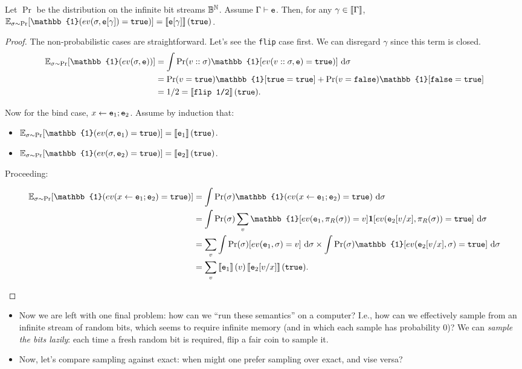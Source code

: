 \documentclass{tufte-handout}
\begin{document}
\begin{theorem}
  Let $\Pr$ be the distribution on the infinite bit streams $\mathbb{B}^{\mathbb{N}}$. Assume $\Gamma \vdash \texttt{e}$.
  Then, for any $\gamma \in \left \llbracket {\Gamma} \right \rrbracket$,
  $\E_{\sigma \sim \Pr}[\mathbb{1}(ev(\sigma, \te[\gamma]) = \true)] = \dbracket{\te[\gamma]}(\true)$.
\end{theorem}
\begin{proof}
  The non-probabilistic cases are straightforward. Let's see the \texttt{flip} 
  case first. We can disregard $\gamma$ since this term is closed.
  \begin{align*}
    \E_{\sigma \sim \Pr}[\mathbb{1}(ev(\sigma, \te))] &= 
    \int \Pr(v::\sigma) \mathbb{1}[ev(v::\sigma, \te) = \true)]~\mathrm{d}\sigma \\ 
    &= \Pr(v = \true) \mathbb{1}[\true = \true] + \Pr(v = \false)\mathbb{1}[\false = \true] \\ 
    &= 1/2 = \dbracket{\texttt{flip~1/2}}(\true).
  \end{align*}

  Now for the bind case, $x \leftarrow \texttt{e}_1; \texttt{e}_2$. Assume by induction that:
  \begin{itemize}
    \item $\E_{\sigma \sim \Pr}[\mathbb{1}(ev(\sigma, \te_1) = \true)] = \dbracket{\te_1}(\true)$.
    \item $\E_{\sigma \sim \Pr}[\mathbb{1}(ev(\sigma, \te_2) = \true)] = \dbracket{\te_2}(\true)$.
  \end{itemize}
  Proceeding:
  \begin{fullwidth}
  \begin{align}
    \E_{\sigma \sim \Pr}[\mathbb{1}(ev(x \leftarrow \te_1; \te_2) = \true)] 
    &= \int \Pr(\sigma) \mathbb{1}(ev(x \leftarrow \te_1; \te_2) = \true)~\mathrm{d}\sigma \\ 
    &= \int \Pr(\sigma) \sum_v \mathbb{1}[ev(\te_1, \pi_R(\sigma)) = v] \mathbf{1}[ev(\te_2[v/x], \pi_R(\sigma)) = \true]~\mathrm{d}\sigma \\ 
    &= \sum_v \int \Pr(\sigma) [ev(\te_1, \sigma) = v]~\mathrm{d}\sigma \times \int \Pr(\sigma) \mathbb{1}[ev(\te_2[v/x], \sigma) = \true]~\mathrm{d}\sigma\\
    &= \sum_v \dbracket{\te_1}(v) \dbracket{\te_2[v/x]}(\true).
  \end{align}
\end{fullwidth}
\end{proof}

\begin{itemize}
  \item Now we are left with one final problem: how can we ``run these
  semantics'' on a computer?  I.e., how can we effectively sample from an
  infinite stream of random bits, which seems to require infinite memory (and in
  which each sample has probability 0)? We can \emph{sample the bits lazily}: 
  each time a fresh random bit is required, flip a fair coin to sample it.

  \item Now, let's compare sampling against exact: when might one prefer 
  sampling over exact, and vise versa?
\end{itemize}
\end{document}
